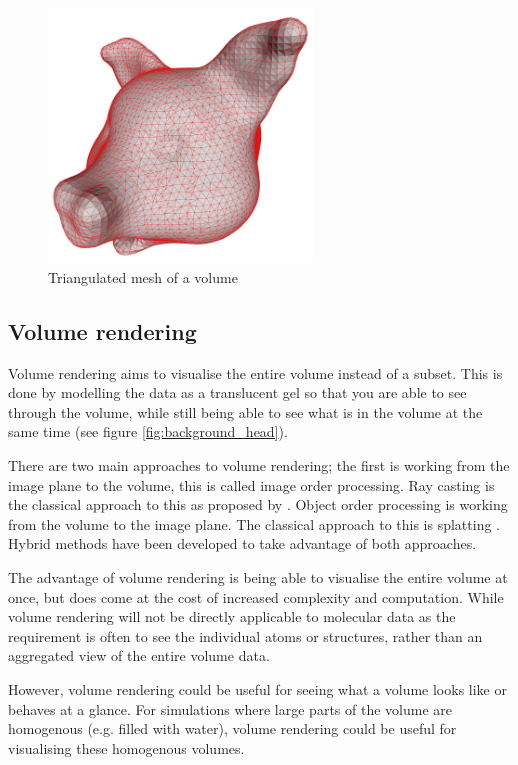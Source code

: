 \begin{figure}[h!]
  \begin{center}
    \includegraphics[width=70mm]{triangulated_mesh}
  \end{center}
  \caption{Triangulated mesh of a volume}
  \label{fig:background_mesh}
\end{figure}


\subsection{Volume rendering}
\label{sub:background_volume}

Volume rendering aims to visualise the entire volume instead of a subset. This
is done by modelling the data as a translucent gel so that you are able to see
through the volume, while still being able to see what is in the volume at the
same time (see figure \ref{fig:background_head}).

There are two main approaches to volume rendering; the first is working from the
image plane to the volume, this is called image order processing. Ray casting is
the classical approach to this as proposed by \citet{levoy88}. Object order
processing is working from the volume to the image plane. The classical approach
to this is splatting \citep{westover89}. Hybrid methods have been developed to
take advantage of both approaches.

The advantage of volume rendering is being able to visualise the entire volume
at once, but does come at the cost of increased complexity and computation.
While volume rendering will not be directly applicable to molecular data as the
requirement is often to see the individual atoms or structures, rather than an
aggregated view of the entire volume data.

However, volume rendering could be useful for seeing what a volume looks like
or behaves at a glance. For simulations where large parts of the volume are
homogenous (e.g. filled with water), volume rendering could be useful for
visualising these homogenous volumes.

